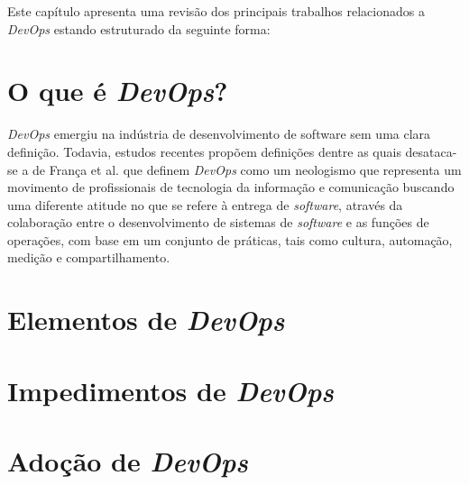 \newcommand{\texCommand}[1]{\texttt{\textbackslash{#1}}}%

\newcommand{\exemplo}[1]{%
\vspace{\baselineskip}%
\noindent\fbox{\begin{minipage}{\textwidth}#1\end{minipage}}%
\\\vspace{\baselineskip}}%

\newcommand{\exemploVerbatim}[1]{%
\vspace{\baselineskip}%
\noindent\fbox{\begin{minipage}{\textwidth}%
#1\end{minipage}}%
\\\vspace{\baselineskip}}%

Este capítulo apresenta uma revisão dos principais trabalhos relacionados a
\textit{DevOps} estando estruturado da seguinte forma:

\section{O que é \textit{DevOps}?}

\textit{DevOps} emergiu na indústria de desenvolvimento de software sem uma
clara definição. Todavia, estudos recentes propõem definições
dentre as quais desataca-se a de França et al. \cite{characterizing_devops}
que definem \textit{DevOps} como um neologismo que representa um movimento de
profissionais de tecnologia da informação e comunicação buscando uma
diferente atitude no que se refere à entrega de \textit{software},
através da colaboração entre o desenvolvimento de sistemas de
\textit{software} e as funções de operações, com base em um conjunto
de práticas, tais como cultura, automação, medição e compartilhamento.

\section{Elementos de \textit{DevOps}}

\section{Impedimentos de \textit{DevOps}}

\section{Adoção de \textit{DevOps}}

